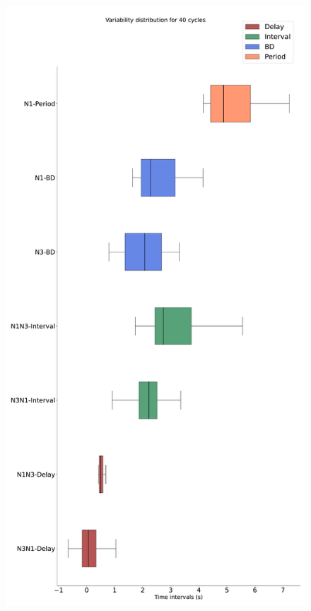 \begin{figure}[htbp]
\begin{minipage}[b]{0.43\textwidth}
		\includegraphics[width=\textwidth]{./invariants/data/SUSSEX/CV1a_driven4/images/stim_cv1a4_boxplot.pdf}
	\end{minipage}
	\begin{minipage}[b]{0.55\textwidth}
		\centering

\end{minipage}
\end{figure}
